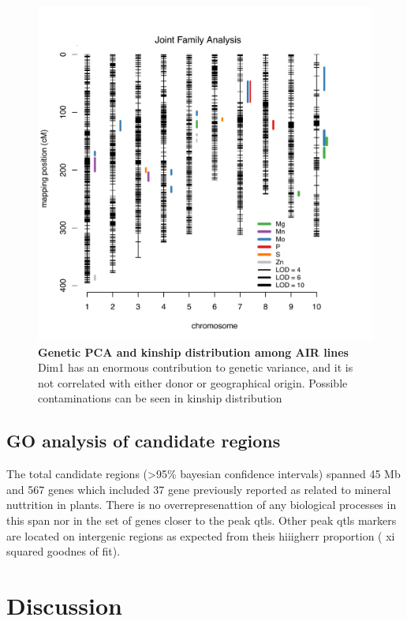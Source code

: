 \begin{figure}[!ht]
\includegraphics[width=0.8\paperwidth]{Chapter-3/figs/fig3-4.pdf}
\caption{\textbf{Genetic PCA and kinship distribution among AIR lines}
Dim1 has an enormous contribution to genetic variance, and it is not correlated with either donor or geographical origin. Possible contaminations can be seen in kinship distribution}
\label{Fig3.1}
\end{figure}
\clearpage


\subsection{GO analysis of candidate regions}
The total candidate regions (>95\% bayesian confidence intervals) spanned 45 Mb and 567 genes which included 37 gene previously reported as related to mineral nuttrition in plants. There is no overrepresenattion of any biological processes in this span nor in the set of genes closer to the peak qtls. Other peak qtls  markers are located on intergenic regions as expected from theis hiiigherr proportion ( xi squared goodnes of fit). 

\section{Discussion}

\printbibliography[heading=subbibintoc, title=References,]

